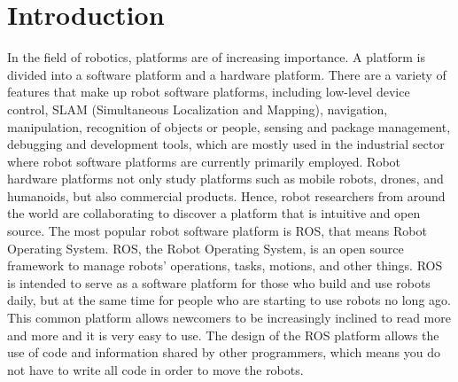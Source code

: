 \section{Introduction}
In the field of robotics, platforms are of increasing importance. A platform is divided into a software platform and a hardware platform. There are a variety of features that make up robot software platforms, including low-level device control, SLAM (Simultaneous Localization and Mapping), navigation, manipulation, recognition of objects or people, sensing and package management, debugging and development tools, which are mostly used in the industrial sector where robot software platforms are currently primarily employed. Robot hardware platforms not only study platforms such as mobile robots, drones, and humanoids, but also commercial products. Hence, robot researchers from around the world are collaborating to discover a platform that is intuitive and open source. The most popular robot software platform is ROS, that means Robot Operating System. ROS, the Robot Operating System, is an open source framework to manage robots’ operations, tasks, motions, and other things. ROS is intended to serve as a software platform for those who build and use robots daily, but at the same time for people who are starting to use robots no long ago. This common platform allows newcomers to be increasingly inclined to read more and more and it is very easy to use. The design of the ROS platform allows the use of code and information shared by other programmers, which means you do not have to write all code in order to move the robots.
\newpage
